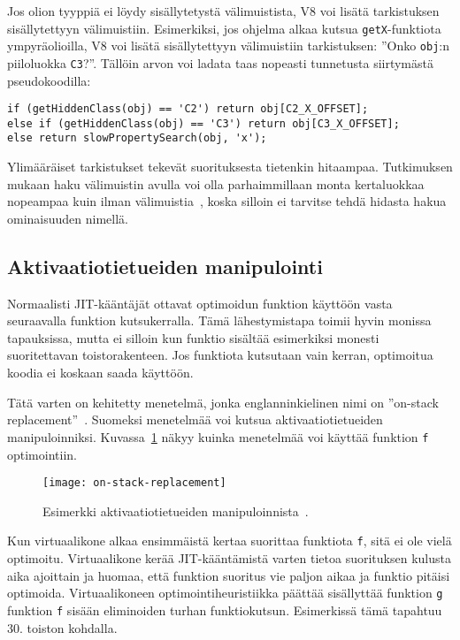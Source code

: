 Jos olion tyyppiä ei löydy sisällytetystä välimuistista, V8 voi lisätä tarkistuksen sisällytettyyn välimuistiin. Esimerkiksi, jos ohjelma alkaa kutsua \texttt{getX}-funktiota ympyräolioilla, V8 voi lisätä sisällytettyyn välimuistiin tarkistuksen: ''Onko \texttt{obj}:n piiloluokka \texttt{C3}?''. Tällöin arvon voi ladata taas nopeasti tunnetusta siirtymästä pseudokoodilla:
\begin{lstlisting}
if (getHiddenClass(obj) == 'C2') return obj[C2_X_OFFSET];
else if (getHiddenClass(obj) == 'C3') return obj[C3_X_OFFSET];
else return slowPropertySearch(obj, 'x');
\end{lstlisting}

Ylimääräiset tarkistukset tekevät suorituksesta tietenkin hitaampaa. Tutkimuksen mukaan haku välimuistin avulla voi olla parhaimmillaan monta kertaluokkaa nopeampaa kuin ilman välimuistia~\cite[s.~498]{Ahn2014}, koska silloin ei tarvitse tehdä hidasta hakua ominaisuuden nimellä.

\subsection{Aktivaatiotietueiden manipulointi}

Normaalisti JIT-kääntäjät ottavat optimoidun funktion käyttöön vasta seuraavalla funktion kutsukerralla. Tämä lähestymistapa toimii hyvin monissa tapauksissa, mutta ei silloin kun funktio sisältää esimerkiksi monesti suoritettavan toistorakenteen. Jos funktiota kutsutaan vain kerran, optimoitua koodia ei koskaan saada käyttöön.

Tätä varten on kehitetty menetelmä, jonka englanninkielinen nimi on ''on-stack replacement''~\cite{osr}. Suomeksi menetelmää voi kutsua aktivaatiotietueiden manipuloinniksi. Kuvassa~\ref{fig:osr} näkyy kuinka menetelmää voi käyttää funktion \texttt{f} optimointiin.

\begin{figure}[ht]
    \texttt{[image: on-stack-replacement]}
    \caption{Esimerkki aktivaatiotietueiden manipuloinnista~\cite{osrpic}.}
     \centering
     \label{fig:osr}
\end{figure}

Kun virtuaalikone alkaa ensimmäistä kertaa suorittaa funktiota \texttt{f}, sitä ei ole vielä optimoitu. Virtuaalikone kerää JIT-kääntämistä varten tietoa suorituksen kulusta aika ajoittain ja huomaa, että funktion suoritus vie paljon aikaa ja funktio pitäisi optimoida. Virtuaalikoneen optimointiheuristiikka päättää sisällyttää funktion \texttt{g} funktion \texttt{f} sisään eliminoiden turhan funktiokutsun. Esimerkissä tämä tapahtuu 30. toiston kohdalla.

